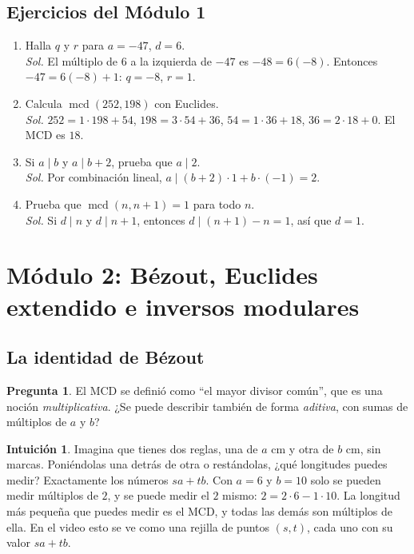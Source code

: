 \documentclass[11pt,a4paper]{article}
\theoremstyle{definition}
\newcommand{\mcd}{\operatorname{mcd}}
\theoremstyle{notait}
\newtheorem*{pregunta}{Pregunta}
\theoremstyle{nota}
\newtheorem*{intuicion}{Intuición}
\begin{document}
\subsection*{Ejercicios del Módulo 1}
\begin{enumerate}[label=\textbf{1.\arabic*}]
\item Halla $q$ y $r$ para $a=-47$, $d=6$.\\
\emph{Sol.} El múltiplo de 6 a la izquierda de $-47$ es $-48=6(-8)$. Entonces $-47=6(-8)+1$: $q=-8$, $r=1$.
\item Calcula $\mcd(252,198)$ con Euclides.\\
\emph{Sol.} $252=1\cdot198+54$, $198=3\cdot54+36$, $54=1\cdot36+18$, $36=2\cdot18+0$. El MCD es $18$.
\item Si $a\mid b$ y $a\mid b+2$, prueba que $a\mid 2$.\\
\emph{Sol.} Por combinación lineal, $a\mid (b+2)\cdot1+b\cdot(-1)=2$.
\item Prueba que $\mcd(n,n+1)=1$ para todo $n$.\\
\emph{Sol.} Si $d\mid n$ y $d\mid n+1$, entonces $d\mid (n+1)-n=1$, así que $d=1$.
\end{enumerate}

\newpage
\section{Módulo 2: Bézout, Euclides extendido e inversos modulares}

\subsection{La identidad de Bézout}

\begin{pregunta}
El MCD se definió como ``el mayor divisor común'', que es una noción \emph{multiplicativa}. ¿Se puede describir también de forma \emph{aditiva}, con sumas de múltiplos de $a$ y $b$?
\end{pregunta}

\begin{intuicion}
Imagina que tienes dos reglas, una de $a$ cm y otra de $b$ cm, sin marcas. Poniéndolas una detrás de otra o restándolas, ¿qué longitudes puedes medir? Exactamente los números $sa+tb$. Con $a=6$ y $b=10$ solo se pueden medir múltiplos de $2$, y se puede medir el $2$ mismo: $2=2\cdot6-1\cdot10$. La longitud más pequeña que puedes medir es el MCD, y todas las demás son múltiplos de ella. En el video esto se ve como una rejilla de puntos $(s,t)$, cada uno con su valor $sa+tb$.
\end{intuicion}
\end{document}
